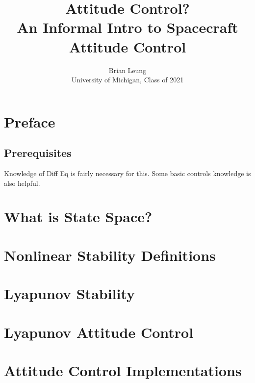 \documentclass[a4paper,14pt]{extreport}
\title{Attitude Control? \\
\large An Informal Intro to Spacecraft Attitude Control}
\author{Brian Leung\\University of Michigan, Class of 2021}
\begin{document}
\maketitle
\setcounter{tocdepth}{0}
\tableofcontents{}
\chapter{Preface}
\section{Prerequisites}
Knowledge of Diff Eq is fairly necessary for this.
Some basic controls knowledge is also helpful.

\chapter{What is State Space?}

\chapter{Nonlinear Stability Definitions}

\chapter{Lyapunov Stability}

\chapter{Lyapunov Attitude Control}

\chapter{Attitude Control Implementations}
\end{document}
